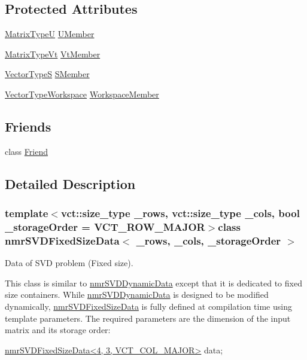 \subsection*{Protected Attributes}
\begin{DoxyCompactItemize}
\item 
\hyperlink{classnmr_s_v_d_fixed_size_data_a164bbc8eccf8b1102d5a85dde45de99d}{Matrix\+Type\+U} \hyperlink{classnmr_s_v_d_fixed_size_data_ad26dae6ca89cbab697b173587128bee8}{U\+Member}
\item 
\hyperlink{classnmr_s_v_d_fixed_size_data_ab9a7c396f7a83256d5e8c789b3a23591}{Matrix\+Type\+Vt} \hyperlink{classnmr_s_v_d_fixed_size_data_a1c07f9c42ce77a3a5c4d922b551b678e}{Vt\+Member}
\item 
\hyperlink{classnmr_s_v_d_fixed_size_data_ad9ec4977d4726118af8c7bce3d18b752}{Vector\+Type\+S} \hyperlink{classnmr_s_v_d_fixed_size_data_a4082c30345cdec4efd06e43a5343037e}{S\+Member}
\item 
\hyperlink{classnmr_s_v_d_fixed_size_data_a82162baa88dba7eb39bb52b71435aaa9}{Vector\+Type\+Workspace} \hyperlink{classnmr_s_v_d_fixed_size_data_a2821e6d6be56a77b1584b9994d7b1a83}{Workspace\+Member}
\end{DoxyCompactItemize}
\subsection*{Friends}
\begin{DoxyCompactItemize}
\item 
class \hyperlink{classnmr_s_v_d_fixed_size_data_a7f8321d57e81bc613d5dbef3410ba70e}{Friend}
\end{DoxyCompactItemize}


\subsection{Detailed Description}
\subsubsection*{template$<$vct\+::size\+\_\+type \+\_\+rows, vct\+::size\+\_\+type \+\_\+cols, bool \+\_\+storage\+Order = V\+C\+T\+\_\+\+R\+O\+W\+\_\+\+M\+A\+J\+O\+R$>$class nmr\+S\+V\+D\+Fixed\+Size\+Data$<$ \+\_\+rows, \+\_\+cols, \+\_\+storage\+Order $>$}

Data of S\+V\+D problem (Fixed size). 

This class is similar to \hyperlink{classnmr_s_v_d_dynamic_data}{nmr\+S\+V\+D\+Dynamic\+Data} except that it is dedicated to fixed size containers. While \hyperlink{classnmr_s_v_d_dynamic_data}{nmr\+S\+V\+D\+Dynamic\+Data} is designed to be modified dynamically, \hyperlink{classnmr_s_v_d_fixed_size_data}{nmr\+S\+V\+D\+Fixed\+Size\+Data} is fully defined at compilation time using template parameters. The required parameters are the dimension of the input matrix and its storage order\+: 
\begin{DoxyCode}
\hyperlink{classnmr_s_v_d_fixed_size_data}{nmrSVDFixedSizeData<4, 3, VCT\_COL\_MAJOR>} data;
\end{DoxyCode}


